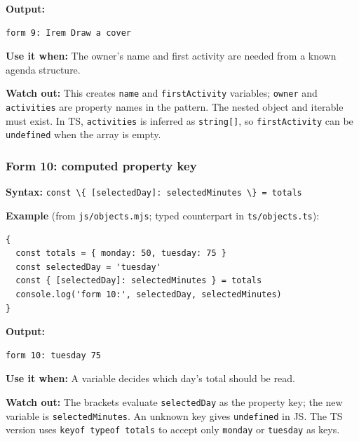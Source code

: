 \documentclass[
  11pt,
]{article}
\newcommand{\passthrough}[1]{#1}
\begin{document}
\textbf{Output:}

\begin{lstlisting}
form 9: Irem Draw a cover
\end{lstlisting}

\textbf{Use it when:} The owner's name and first activity are needed
from a known agenda structure.

\textbf{Watch out:} This creates \passthrough{\lstinline!name!} and
\passthrough{\lstinline!firstActivity!} variables;
\passthrough{\lstinline!owner!} and \passthrough{\lstinline!activities!}
are property names in the pattern. The nested object and iterable must
exist. In TS, \passthrough{\lstinline!activities!} is inferred as
\passthrough{\lstinline!string[]!}, so
\passthrough{\lstinline!firstActivity!} can be
\passthrough{\lstinline!undefined!} when the array is empty.

\subsubsection{Form 10: computed property
key}\label{form-10-computed-property-key}

\textbf{Syntax:}
\passthrough{\lstinline!const \{ [selectedDay]: selectedMinutes \} = totals!}

\textbf{Example} (from \passthrough{\lstinline!js/objects.mjs!}; typed
counterpart in \passthrough{\lstinline!ts/objects.ts!}):

\begin{lstlisting}
{
  const totals = { monday: 50, tuesday: 75 }
  const selectedDay = 'tuesday'
  const { [selectedDay]: selectedMinutes } = totals
  console.log('form 10:', selectedDay, selectedMinutes)
}
\end{lstlisting}

\textbf{Output:}

\begin{lstlisting}
form 10: tuesday 75
\end{lstlisting}

\textbf{Use it when:} A variable decides which day's total should be
read.

\textbf{Watch out:} The brackets evaluate
\passthrough{\lstinline!selectedDay!} as the property key; the new
variable is \passthrough{\lstinline!selectedMinutes!}. An unknown key
gives \passthrough{\lstinline!undefined!} in JS. The TS version uses
\passthrough{\lstinline!keyof typeof totals!} to accept only
\passthrough{\lstinline!monday!} or \passthrough{\lstinline!tuesday!} as
keys.
\end{document}
